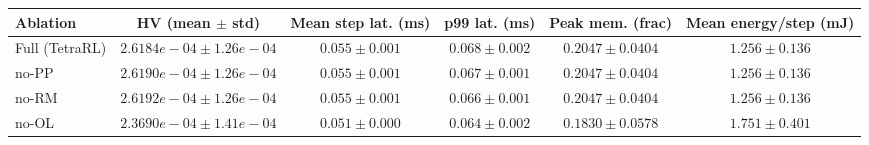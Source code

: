 \begin{tabular}{lccccc}
\toprule
Ablation & HV (mean $\pm$ std) & Mean step lat. (ms) & p99 lat. (ms) & Peak mem. (frac) & Mean energy/step (mJ) \\
\midrule
Full (TetraRL) & $2.6184e-04 \pm 1.26e-04$ & $0.055 \pm 0.001$ & $0.068 \pm 0.002$ & $0.2047 \pm 0.0404$ & $1.256 \pm 0.136$ \\
no-PP & $2.6190e-04 \pm 1.26e-04$ & $0.055 \pm 0.001$ & $0.067 \pm 0.001$ & $0.2047 \pm 0.0404$ & $1.256 \pm 0.136$ \\
no-RM & $2.6192e-04 \pm 1.26e-04$ & $0.055 \pm 0.001$ & $0.066 \pm 0.001$ & $0.2047 \pm 0.0404$ & $1.256 \pm 0.136$ \\
no-OL & $2.3690e-04 \pm 1.41e-04$ & $0.051 \pm 0.000$ & $0.064 \pm 0.002$ & $0.1830 \pm 0.0578$ & $1.751 \pm 0.401$ \\
\bottomrule
\end{tabular}
